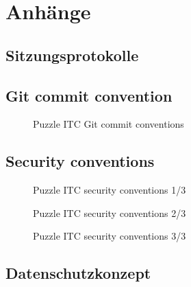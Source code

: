\chapter{Anhänge}

\section{Sitzungsprotokolle}

\section{Git commit convention}
\label{sec:gitconv}
\begin{figure}[h]
    \centering
    \caption{Puzzle ITC Git commit conventions}
    \end{figure}

\section{Security conventions}
\label{sec:secconv}
\begin{figure}[h]
    \centering
    \caption{Puzzle ITC security conventions 1/3}
    \end{figure}
\begin{figure}[h]
    \centering
    \caption{Puzzle ITC security conventions 2/3 }
    \end{figure}  
\begin{figure}[h]
    \centering
    \caption{Puzzle ITC security conventions 3/3}
    \end{figure}  

\section{Datenschutzkonzept}
\label{sec:datsec}





